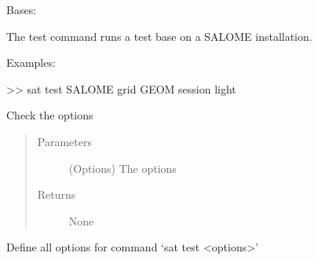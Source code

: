 \documentclass[a4paper,10pt,english]{sphinxmanual}
\begin{document}
\begin{fulllineitems}
\label{\detokenize{apidoc_commands/commands:commands.test.Command}}
Bases: 

The test command runs a test base on a SALOME installation.

\begin{DUlineblock}{0em}
\item[] Examples:
\item[] \textgreater{}\textgreater{} sat test SALOME \textendash{}grid GEOM \textendash{}session light
\end{DUlineblock}

\begin{fulllineitems}
\label{\detokenize{apidoc_commands/commands:commands.test.Command.check_option}}
Check the options
\begin{quote}\begin{description}
\item[{Parameters}] \leavevmode
{} \textendash{} (Options) The options

\item[{Returns}] \leavevmode
None

\end{description}\end{quote}

\end{fulllineitems}


\begin{fulllineitems}
\label{\detokenize{apidoc_commands/commands:commands.test.Command.getParser}}
Define all options for command ‘sat test \textless{}options\textgreater{}’

\end{fulllineitems}


\begin{fulllineitems}
\label{\detokenize{apidoc_commands/commands:commands.test.Command.name}}
\end{fulllineitems}


\end{fulllineitems}
\end{document}
